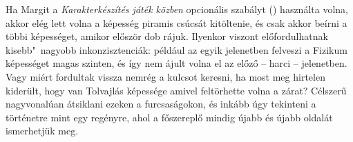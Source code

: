 \begin{center}
\end{center}

Ha Margit a \emph{Karakterkészítés játék közben} opcionális szabályt () használta volna, akkor elég lett volna a képesség piramis csúcsát kitöltenie, és csak akkor beírni a többi képességet, amikor először dob rájuk. Ilyenkor viszont előfordulhatnak kisebb"~nagyobb inkonzisztenciák: például az egyik jelenetben felveszi a Fizikum képességet magas szinten, és így nem ájult volna el az előző -- harci -- jelenetben. Vagy miért fordultak vissza nemrég a kulcsot keresni, ha most meg hirtelen kiderült, hogy van Tolvajlás képessége amivel feltörhette volna a zárat? Célszerű nagyvonalúan átsiklani ezeken a furcsaságokon, és inkább úgy tekinteni a történetre mint egy regényre, ahol a főszereplő mindig újabb és újabb oldalát ismerhetjük meg.
